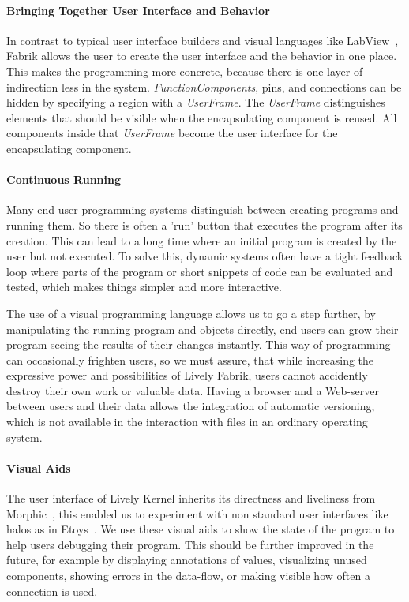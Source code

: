 \documentclass[pdftex, times, 10pt, twocolumn]{article}
\begin{document}
\paragraph{Bringing Together User Interface and Behavior}
In contrast to typical user interface builders and visual languages like LabView~\cite{Bitter2006LAP}, Fabrik allows the user to create the user interface and the behavior in one place. This makes the programming more concrete, because there is one layer of indirection less in the system. {\em FunctionComponents}, pins, and connections can be hidden by specifying a region with a {\em UserFrame}. The {\em UserFrame} distinguishes elements that should be visible when the encapsulating component is reused. All components inside that {\em UserFrame} become the user interface for the encapsulating component.  



\paragraph{Continuous Running}
Many end-user programming systems distinguish between creating programs and running them. So there is often a 'run' button that executes the program after its creation. This can lead to a long time where an initial program is created by the user but not executed. To solve this, dynamic systems often have a tight feedback loop where parts of the program or short snippets of code can be evaluated and tested, which makes things simpler and  more interactive. 

The use of a visual programming language allows us to go a step further, by manipulating the running program and objects directly, end-users can grow their program seeing the results of their changes instantly. This way of programming can occasionally frighten users, so we must assure, that while increasing the expressive power and possibilities of Lively Fabrik, users cannot accidently destroy their own work or valuable data. Having a browser and a Web-server between users and their data allows the integration of automatic versioning, which is not available in the interaction with files in an ordinary operating system.  



\paragraph{Visual Aids}
The user interface of Lively Kernel inherits its directness and liveliness from Morphic~\cite{Maloney1995DLM}, this enabled us to experiment with non standard user interfaces like halos as in Etoys~\cite{Kay2005SEA}. We use these  visual aids to show the state of the program to help users debugging their program. This should be further improved in the future, for example by displaying annotations of values, visualizing unused components, showing errors in the data-flow, or making visible how often a connection is used. 
\end{document}
